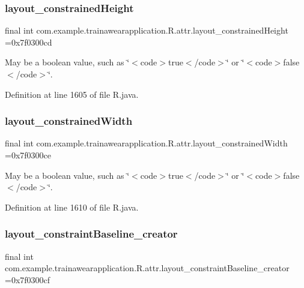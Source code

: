 \subsubsection{\texorpdfstring{layout\_constrainedHeight}{layout\_constrainedHeight}}
{\footnotesize\ttfamily final int com.\+example.\+trainawearapplication.\+R.\+attr.\+layout\+\_\+constrained\+Height =0x7f0300cd\hspace{0.3cm}{\ttfamily [static]}}

May be a boolean value, such as \char`\"{}$<$code$>$true$<$/code$>$\char`\"{} or \char`\"{}$<$code$>$false$<$/code$>$\char`\"{}. 

Definition at line 1605 of file R.\+java.

\mbox{\label{classcom_1_1example_1_1trainawearapplication_1_1_r_1_1attr_ad18f6105d5a1422f58cc83457ce0d689}} 
\subsubsection{\texorpdfstring{layout\_constrainedWidth}{layout\_constrainedWidth}}
{\footnotesize\ttfamily final int com.\+example.\+trainawearapplication.\+R.\+attr.\+layout\+\_\+constrained\+Width =0x7f0300ce\hspace{0.3cm}{\ttfamily [static]}}

May be a boolean value, such as \char`\"{}$<$code$>$true$<$/code$>$\char`\"{} or \char`\"{}$<$code$>$false$<$/code$>$\char`\"{}. 

Definition at line 1610 of file R.\+java.

\mbox{\label{classcom_1_1example_1_1trainawearapplication_1_1_r_1_1attr_ad1a31094ec507602f16238f092f0375b}} 
\subsubsection{\texorpdfstring{layout\_constraintBaseline\_creator}{layout\_constraintBaseline\_creator}}
{\footnotesize\ttfamily final int com.\+example.\+trainawearapplication.\+R.\+attr.\+layout\+\_\+constraint\+Baseline\+\_\+creator =0x7f0300cf\hspace{0.3cm}{\ttfamily [static]}}

